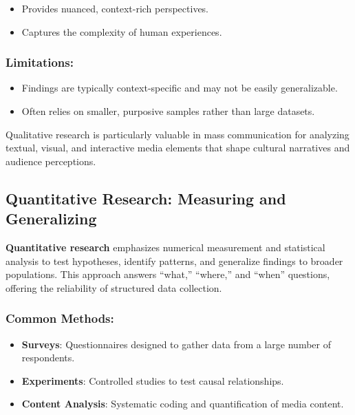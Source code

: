 \documentclass[
]{book}
\providecommand{\tightlist}{%
  \setlength{\itemsep}{0pt}\setlength{\parskip}{0pt}}
\begin{document}
\begin{itemize}
\tightlist
\item
  Provides nuanced, context-rich perspectives.
\item
  Captures the complexity of human experiences.
\end{itemize}

\subsubsection*{Limitations:}\label{limitations}

\begin{itemize}
\tightlist
\item
  Findings are typically context-specific and may not be easily generalizable.
\item
  Often relies on smaller, purposive samples rather than large datasets.
\end{itemize}

Qualitative research is particularly valuable in mass communication for analyzing textual, visual, and interactive media elements that shape cultural narratives and audience perceptions.

\subsection*{Quantitative Research: Measuring and Generalizing}\label{quantitative-research-measuring-and-generalizing}

\textbf{Quantitative research} emphasizes numerical measurement and statistical analysis to test hypotheses, identify patterns, and generalize findings to broader populations. This approach answers ``what,'' ``where,'' and ``when'' questions, offering the reliability of structured data collection.

\subsubsection*{Common Methods:}\label{common-methods-1}

\begin{itemize}
\tightlist
\item
  \textbf{Surveys}: Questionnaires designed to gather data from a large number of respondents.
\item
  \textbf{Experiments}: Controlled studies to test causal relationships.
\item
  \textbf{Content Analysis}: Systematic coding and quantification of media content.
\end{itemize}
\end{document}
